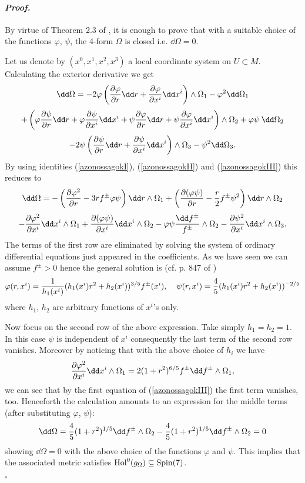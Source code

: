 \documentclass[a4paper,12pt,draft]{article}
\newenvironment{proof}{\paragraph{\it Proof.}}{$\square$\vskip0.4cm}
\begin{document}
\begin{proof} By virtue of Theorem 2.3 of \cite{bry-sal}, it is enough to
prove that with a suitable choice of the functions $\varphi$, $\psi$, the
4-form $\Omega$ is closed i.e. $\dd\Omega =0$. 

Let us denote by $(x^0, x^1, x^2, x^3)$ a local coordinate
system on $U\subset M$. Calculating the exterior derivative we get
\[\dd\Omega =-2\varphi\left({\partial\varphi\over\partial
r}\dd
r+{\partial\varphi\over\partial x^i}\dd x^i\right)
\wedge\Omega_1-\varphi^2\dd\Omega_1\]
\[+\left(\varphi{\partial\psi\over\partial r}\dd r
+\varphi{\partial\psi\over\partial x^i}\dd x^i
+\psi{\partial\varphi\over\partial r}\dd r +
\psi{\partial\varphi\over\partial x^i}\dd
x^i\right)\wedge\Omega_2+\varphi\psi\:\dd\Omega_2\]
\[-2\psi\left({\partial\psi\over\partial r}\dd
r+{\partial\psi\over\partial x^i}\dd
x^i\right)\wedge\Omega_3-\psi^2\dd\Omega_3.\]
By using identities (\ref{azonossagokI}), (\ref{azonossagokII}) and
(\ref{azonossagokIII}) this reduces to
\[\dd\Omega =-\left({\partial\varphi^2\over\partial
r}-3rf^\pm\varphi\psi\right)\dd
r\wedge\Omega_1+\left({\partial (\varphi\psi )\over \partial r}-{r\over
2}f^\pm\psi^2\right)\dd r\wedge\Omega_2\]
\[-{\partial \varphi^2\over\partial x^i}\dd x^i\wedge\Omega_1+{\partial
(\varphi\psi )\over\partial x^i}\dd
x^i\wedge\Omega_2-\varphi\psi{\dd f^\pm\over
f^\pm}\wedge\Omega_2-{\partial\psi^2\over\partial x^i}\dd
x^i\wedge\Omega_3.\]
The terms of the first row are eliminated by solving the system of
ordinary differential equations just appeared in the coefficients. As we
have seen we can assume $f^\pm >0$ hence the general solution is
(cf. p. 847
of \cite{bry-sal})
\[\varphi (r, x^i) ={1\over
h_1(x^i)}(h_1(x^i)r^2+h_2(x^i))^{3/5}f^\pm (x^i),
\:\:\:\:\:\psi (r, x^i)={4\over 5}(h_1(x^i)r^2+h_2(x^i))^{-2/5}\]
where $h_1$, $h_2$ are arbitrary functions of $x^i$'s only.

Now focus on the second row of the above expression. Take simply
$h_1=h_2=1$. In this case $\psi$ is independent of $x^i$ consequently the
last term of the second row vanishes. Moreover by noticing that with the
above choice of $h_i$ we have
\[{\partial\varphi^2\over\partial x^i}\dd
x^i\wedge\Omega_1=2(1+r^2)^{6/5}f^\pm\dd f^\pm\wedge\Omega_1,\]
we can see that by the first equation of
(\ref{azonossagokIII}) the first term vanishes, too. Henceforth the
calculation amounts to an expression for
the middle terms (after substituting $\varphi$, $\psi$):
\[\dd\Omega ={4\over 5}(1+r^2)^{1/5}\dd f^\pm\wedge\Omega_2-{4\over
5}(1+r^2)^{1/5}\dd f^\pm\wedge\Omega_2 =0\]
showing $\dd\Omega =0$ with the above choice of the functions $\varphi$
and $\psi$. This implies that the associated metric satisfies ${\rm
Hol}^0(g_\Omega )\subseteq{\rm Spin}(7)$.


\end{proof}
\end{document}
